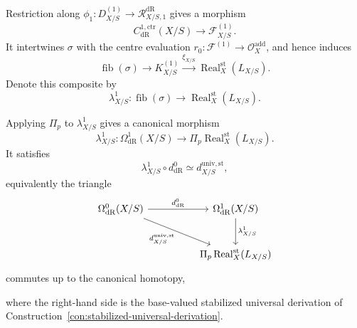 Restriction along
\(\phi_1:D^{(1)}_{X/S}\to \mathcal R^{\mathrm{dR}}_{X/S,1}\) gives a morphism
\[
  C^{1,\mathrm{ctr}}_{\mathrm{dR}}(X/S)
  \longrightarrow
  \mathscr F^{(1)}_{X/S}.
\]
It intertwines \(\sigma\) with the centre evaluation
\(r_0:\mathscr F^{(1)}\to\mathcal O_X^{\mathrm{add}}\), and hence induces
\[
  \operatorname{fib}(\sigma)
  \longrightarrow
  K^{(1)}_{X/S}
  \xrightarrow{\xi_{X/S}}
  \operatorname{Real}^{\mathrm{st}}_X(L_{X/S}).
\]
Denote this composite by
\[
  \mathscr\lambda^1_{X/S}:
  \operatorname{fib}(\sigma)
  \longrightarrow
  \operatorname{Real}^{\mathrm{st}}_X(L_{X/S}).
\]

\begin{theorem}
\label{thm:first-order-linearization}
Applying \(\Pi_p\) to \(\mathscr\lambda^1_{X/S}\) gives a canonical morphism
\[
  \lambda^1_{X/S}:
  \Omega^1_{\mathrm{dR}}(X/S)
  \longrightarrow
  \Pi_p\operatorname{Real}^{\mathrm{st}}_X(L_{X/S}).
\]
It satisfies
\[
  \lambda^1_{X/S}\circ d^0_{\mathrm{dR}}
  \simeq
  d^{\mathrm{univ,st}}_{X/S},
\]
equivalently the triangle
\[
\begin{tikzcd}[column sep=huge,row sep=large]
  \Omega^0_{\mathrm{dR}}(X/S)
    \arrow[r,"d^0_{\mathrm{dR}}"]
    \arrow[dr,"d^{\mathrm{univ,st}}_{X/S}"']
  &
  \Omega^1_{\mathrm{dR}}(X/S)
    \arrow[d,"\lambda^1_{X/S}"]
  \\
  &
  \Pi_p\operatorname{Real}^{\mathrm{st}}_X(L_{X/S})
\end{tikzcd}
\]
commutes up to the canonical homotopy,

where the right-hand side is the base-valued stabilized universal derivation of
Construction~\ref{con:stabilized-universal-derivation}.
\end{theorem}

